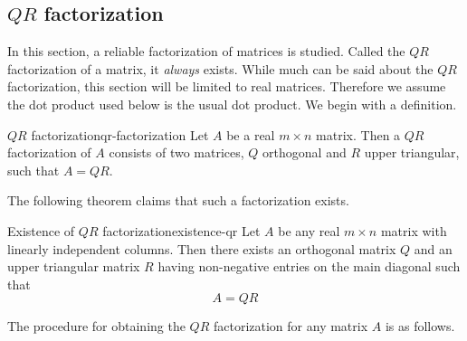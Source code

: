 \subsection{$QR$ factorization}

In this section, a reliable factorization of matrices is studied. Called the $QR$ factorization of a matrix, it \textit{always} exists. While much can be said about the $QR$ factorization, this section will be limited to real matrices. Therefore we assume the dot product used below is the usual dot product. We begin with a definition. 

\begin{definition}{$QR$ factorization}{qr-factorization}
Let $A$ be a real $m\times n$ matrix. Then a $QR$ factorization of $A$ consists
of two matrices, $Q$ orthogonal and $R$ upper
triangular, such that $A=QR.$ 
\end{definition}

The following theorem claims that such a factorization exists. 

\begin{theorem}{Existence of $QR$ factorization}{existence-qr}
Let $A$ be any real $m\times n$ matrix with linearly independent columns. Then there exists an orthogonal
matrix $Q$ and an upper triangular matrix $R$ having non-negative entries
on the main diagonal such that
\begin{equation*}
A=QR
\end{equation*}
\end{theorem}

The procedure for obtaining the $QR$ factorization for any matrix $A$ is as follows.

